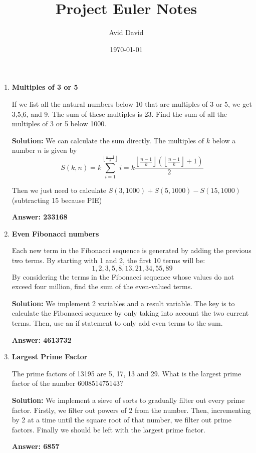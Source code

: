 \documentclass[12pt]{article}
\begin{document}
\title{Project Euler Notes}
\author{Avid David}
\date{\today}
\maketitle
\begin{enumerate}
    \item \textbf{Multiples of 3 or 5}
    \par If we list all the natural numbers below 10 that are multiples of 3 or 5, we get 3,5,6, and 9. The sum of these multiples is 23. Find the sum of all the multiples of 3 or 5 below 1000.
    \par \textbf{Solution:} We can calculate the sum directly. The multiples of $k$ below a number $n$ is given by
    \begin{equation*}
        S(k,n) = k \sum_{i = 1}^{\left\lfloor \frac{n - 1}{k} \right\rfloor} i = k \dfrac{\left\lfloor \frac{n - 1}{k} \right\rfloor (\left\lfloor \frac{n - 1}{k} \right\rfloor + 1)}{2}
    \end{equation*}

    Then we just need to calculate $S(3,1000) + S(5,1000) - S(15,1000)$ (subtracting 15 because PIE)

    \par \textbf{Answer: 233168}

    \item \textbf{Even Fibonacci numbers}
    \par Each new term in the Fibonacci sequence is generated by adding the previous two terms. By starting with 1 and 2, the first 10 terms will be:
    $$ 1,2,3,5,8,13,21,34,55,89$$
    By considering the terms in the Fibonacci sequence whose values do not exceed four million, find the sum of the even-valued terms.

    \par \textbf{Solution:} We implement 2 variables and a result variable. The key is to calculate the Fibonacci sequence by only taking into account the two current terms. Then, use an if statement to only add even terms to the sum. 

    \par \textbf{Answer: 4613732}

    \item \textbf{Largest Prime Factor}
    \par The prime factors of 13195 are 5, 17, 13 and 29. What is the largest prime factor of the number 600851475143?

    \par \textbf{Solution:} We implement a sieve of sorts to gradually filter out every prime factor. Firstly, we filter out powers of 2 from the number. Then, incrementing by 2 at a time until the square root of that number, we filter out prime factors. Finally we should be left with the largest prime factor.
    \par \textbf{Answer: 6857}


\end{enumerate}
\end{document}
